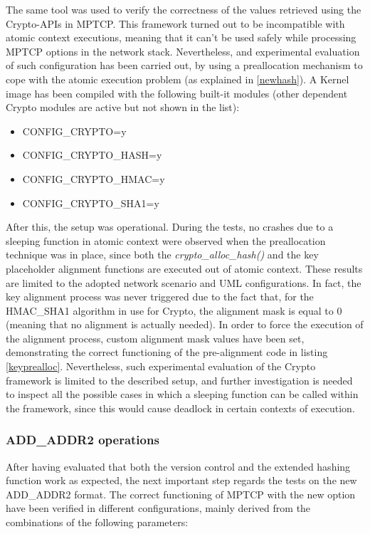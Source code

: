 The same tool was used to verify the correctness of the values retrieved using the Crypto-APIs in MPTCP. This framework turned out to be incompatible with atomic context executions, meaning that it can't be used safely while processing MPTCP options in the network stack. Nevertheless, and experimental evaluation of such configuration has been carried out, by using a preallocation mechanism to cope with the atomic execution problem (as explained in \ref{newhash}). 
A Kernel image has been compiled with the following built-it modules (other dependent Crypto modules are active but not shown in the list):
\begin{itemize}
  \item CONFIG\_CRYPTO=y
  \item CONFIG\_CRYPTO\_HASH=y
  \item CONFIG\_CRYPTO\_HMAC=y
  \item CONFIG\_CRYPTO\_SHA1=y
\end{itemize}
After this, the setup was operational. During the tests, no crashes due to a sleeping function in atomic context were observed when the preallocation technique was in place, since both the \textit{crypto\_alloc\_hash()} and the key placeholder alignment functions are executed out of atomic context. These results are limited to the adopted network scenario and UML configurations. In fact, the key alignment process was never triggered due to the fact that, for the HMAC\_SHA1 algorithm in use for Crypto, the alignment mask is equal to 0 (meaning that no alignment is actually needed). In order to force the execution of the alignment process, custom alignment mask values have been set, demonstrating the correct functioning of the pre-alignment code in listing \ref{keyprealloc}. Nevertheless, such experimental evaluation of the Crypto framework is limited to the described setup, and further investigation is needed to inspect all the possible cases in which a sleeping function can be called within the framework, since this would cause deadlock in certain contexts of execution.

\subsubsection{ADD\_ADDR2 operations}
After having evaluated that both the version control and the extended hashing function work as expected, the next important step regards the tests on the new ADD\_ADDR2 format. The correct functioning of MPTCP with the new option have been verified in different configurations, mainly derived from the combinations of the following parameters:

